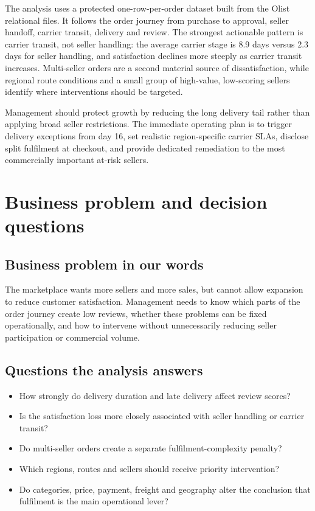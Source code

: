 \documentclass[11pt,a4paper]{article}
\begin{document}
The analysis uses a protected one-row-per-order dataset built from the Olist relational files. It follows the order journey from purchase to approval, seller handoff, carrier transit, delivery and review. The strongest actionable pattern is carrier transit, not seller handling: the average carrier stage is 8.9 days versus 2.3 days for seller handling, and satisfaction declines more steeply as carrier transit increases. Multi-seller orders are a second material source of dissatisfaction, while regional route conditions and a small group of high-value, low-scoring sellers identify where interventions should be targeted.

Management should protect growth by reducing the long delivery tail rather than applying broad seller restrictions. The immediate operating plan is to trigger delivery exceptions from day 16, set realistic region-specific carrier SLAs, disclose split fulfilment at checkout, and provide dedicated remediation to the most commercially important at-risk sellers.

\newpage

\section{Business problem and decision questions}

\subsection{Business problem in our words}
The marketplace wants more sellers and more sales, but cannot allow expansion to reduce customer satisfaction. Management needs to know which parts of the order journey create low reviews, whether these problems can be fixed operationally, and how to intervene without unnecessarily reducing seller participation or commercial volume.

\subsection{Questions the analysis answers}
\begin{itemize}[leftmargin=1.2cm]
    \item How strongly do delivery duration and late delivery affect review scores?
    \item Is the satisfaction loss more closely associated with seller handling or carrier transit?
    \item Do multi-seller orders create a separate fulfilment-complexity penalty?
    \item Which regions, routes and sellers should receive priority intervention?
    \item Do categories, price, payment, freight and geography alter the conclusion that fulfilment is the main operational lever?
\end{itemize}
\end{document}
